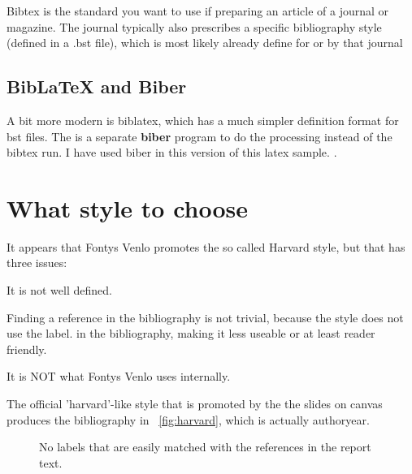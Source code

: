 Bibtex is the standard you want to use if preparing an article of a
journal or magazine. The journal typically also prescribes a specific
bibliography style (defined in a .bst file), which is most likely
already define for or by that journal

\subsection{BibLaTeX and Biber}

A bit more modern is biblatex, which has a much simpler definition
format for bst files. The is a separate \textbf{biber} program to do
the processing instead of the bibtex run.
I have used biber in this version of this latex sample. \parencite{biblatexsite}.

\section{What style to choose}

It appears that Fontys Venlo promotes the so called Harvard style, but that has three issues:
\begin{enumerate*}
\item It is not well defined.
\item Finding a reference in the bibliography is not trivial, because the style does not use the label.
  in the bibliography, making it less useable or at least reader friendly.
\item It is NOT what Fontys Venlo uses internally.
\end{enumerate*}

The official 'harvard'-like style that is promoted by the the slides on canvas
produces the bibliography in ~\vref{fig:harvard}, which is actually authoryear.

\begin{figure}
  \caption{\label{fig:harvard}No labels that are easily matched with the references in the report text.}
\end{figure}

